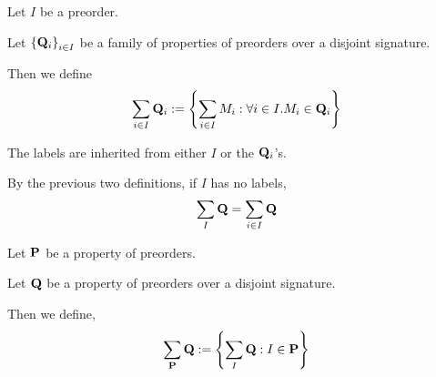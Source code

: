 \begin{definition}
  Let $I$ be a preorder.

  Let $\left\{ {\mathbf{Q}_i} \right\}_{i \in I}$ be a family of properties of preorders
  over a disjoint signature.

  Then we define
  \[
    \sum_{i \in I}{\mathbf{Q}_i} := \left\{ {\sum_{i \in I}{M_i} : \forall i \in I. M_i \in \mathbf{Q}_i} \right\}
  \]

  The labels are inherited from either $I$ or the $\mathbf{Q}_i$'s.
\end{definition}

\begin{note}
  By the previous two definitions, if $I$ has no labels,
  \[
    \sum_{I}{\mathbf{Q}} = \sum_{i \in I}{\mathbf{Q}}
  \]
\end{note}

\begin{definition}
  Let $\mathbf{P}$ be a property of preorders.

  Let $\mathbf{Q}$ be a property of preorders over a disjoint signature.

  Then we define,
  \[
    \sum_{\mathbf{P}}{\mathbf{Q}} := \left\{ {\sum_{I}{\mathbf{Q}} : I \in \mathbf{P}} \right\}
  \]
\end{definition}
